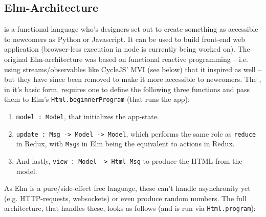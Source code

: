 \subsection{Elm-Architecture}

 is a functional language who's designers set out to create something as accessible to newcomers as Python or Javascript. It can be used to build front-end web application (browser-less execution in node is currently being worked on). The original Elm-architecture was based on functional reactive programming -- i.e. using streams/observables like CycleJS' MVI (see below) that it inspired as well -- but they have since been removed to make it more accessible to
newcomers. The , in it's basic form, requires one to define the following three functions and pass them to Elm's \texttt{Html.beginnerProgram} (that runs the app):


\begin{enumerate}
    \item \texttt{model : Model}, that initializes the app-state.
    \item \texttt{update : Msg -> Model -> Model}, which performs the same role as \texttt{reduce} in Redux, with \texttt{Msg}s in Elm being the equivalent to actions in Redux.
    \item And lastly, \texttt{view : Model -> Html Msg} to produce the HTML from the model.
\end{enumerate}

As Elm is a pure/side-effect free language, these can't handle asynchronity yet (e.g. HTTP-requests, websockets) or even produce random numbers. The full architecture, that handles these, looks as follows (and is run via \texttt{Html.program}):

